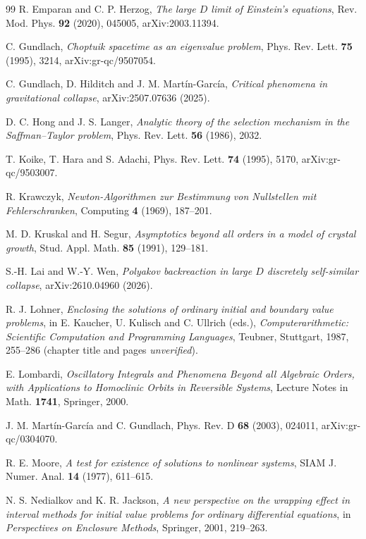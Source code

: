 \documentclass{amsart}
\numberwithin{equation}{section}
\theoremstyle{plain}
\theoremstyle{definition}
\theoremstyle{remark}
\begin{document}
\begin{thebibliography}{99}
 R. Emparan and C. P. Herzog, \emph{The large $D$ limit of Einstein's equations}, Rev. Mod.
Phys. \textbf{92} (2020), 045005, arXiv:2003.11394.

 C. Gundlach, \emph{Choptuik spacetime as an eigenvalue problem}, Phys. Rev. Lett. \textbf{75}
(1995), 3214, arXiv:gr-qc/9507054.

 C. Gundlach, D. Hilditch and J. M. Mart\'in-Garc\'ia, \emph{Critical phenomena in
gravitational collapse}, arXiv:2507.07636 (2025).

 D. C. Hong and J. S. Langer, \emph{Analytic theory of the selection mechanism in the
Saffman--Taylor problem}, Phys. Rev. Lett. \textbf{56} (1986), 2032.

 T. Koike, T. Hara and S. Adachi, Phys. Rev. Lett. \textbf{74} (1995), 5170,
arXiv:gr-qc/9503007.

 R. Krawczyk, \emph{Newton-Algorithmen zur Bestimmung von Nullstellen mit Fehlerschranken},
Computing \textbf{4} (1969), 187--201.

 M. D. Kruskal and H. Segur, \emph{Asymptotics beyond all orders in a model of crystal
growth}, Stud. Appl. Math. \textbf{85} (1991), 129--181.

 S.-H. Lai and W.-Y. Wen, \emph{Polyakov backreaction in large $D$ discretely self-similar collapse},
arXiv:2610.04960 (2026).

 R. J. Lohner, \emph{Enclosing the solutions of ordinary initial and boundary value problems}, in
E. Kaucher, U. Kulisch and C. Ullrich (eds.), \emph{Computerarithmetic: Scientific Computation and Programming
Languages}, Teubner, Stuttgart, 1987, 255--286 (chapter title and pages \emph{unverified}).

 E. Lombardi, \emph{Oscillatory Integrals and Phenomena Beyond all Algebraic Orders, with
Applications to Homoclinic Orbits in Reversible Systems}, Lecture Notes in Math. \textbf{1741}, Springer, 2000.

 J. M. Mart\'in-Garc\'ia and C. Gundlach, Phys. Rev. D \textbf{68} (2003), 024011,
arXiv:gr-qc/0304070.

 R. E. Moore, \emph{A test for existence of solutions to nonlinear systems}, SIAM J. Numer. Anal.
\textbf{14} (1977), 611--615.

 N. S. Nedialkov and K. R. Jackson, \emph{A new perspective on the wrapping effect in
interval methods for initial value problems for ordinary differential equations}, in \emph{Perspectives on Enclosure
Methods}, Springer, 2001, 219--263.


\end{thebibliography}
\end{document}
